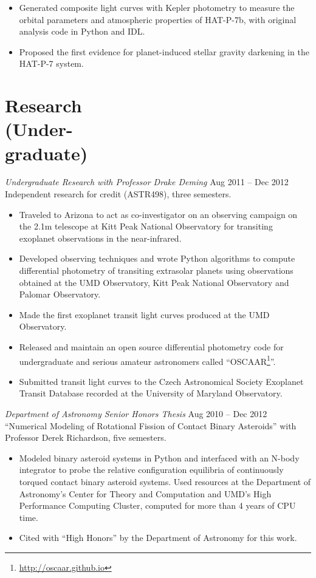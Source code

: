 \documentclass[margin]{res}
\begin{document}
\begin{resume}
\begin{itemize}
\item Generated composite light curves with Kepler photometry to measure the orbital parameters and atmospheric properties of HAT-P-7b, with original analysis code in Python and IDL. 

\item Proposed the first evidence for planet-induced stellar gravity darkening in the HAT-P-7 system.\\
\end{itemize}  

\section{Research \\(Under-\\graduate)} 
{\sl Undergraduate Research with Professor Drake Deming} \hfill            Aug 2011 -- Dec 2012 \\
Independent research for credit (ASTR498), three semesters. 
\begin{itemize}
\item Traveled to Arizona to act as co-investigator on an observing campaign on the 2.1m telescope at Kitt Peak National Observatory for transiting exoplanet observations in the near-infrared. 

\item Developed observing techniques and wrote Python algorithms to compute differential photometry of transiting extrasolar planets using observations obtained at the UMD Observatory, Kitt Peak National Observatory and Palomar Observatory. 

\item Made the first exoplanet transit light curves produced at the UMD Observatory.

\item Released and maintain an open source differential photometry code for undergraduate and serious amateur astronomers called ``OSCAAR\footnote{\url{http://oscaar.github.io}}''.

\item Submitted transit light curves to the Czech Astronomical Society Exoplanet Transit Database recorded at the University of Maryland Observatory.
\end{itemize} 

{\sl Department of Astronomy Senior Honors Thesis} \hfill Aug 2010 -- Dec 2012 \\
``Numerical Modeling of Rotational Fission of Contact Binary Asteroids'' with Professor Derek Richardson, five semesters. 
\begin{itemize}   
\item Modeled binary asteroid systems in Python and interfaced with an N-body integrator to probe the relative configuration equilibria of continuously torqued 
contact binary asteroid systems. Used resources at the Department of Astronomy's Center for Theory and Computation 
and UMD's High Performance Computing Cluster, computed for more than 4 years of CPU time. 
\item Cited with ``High Honors'' by the Department of Astronomy for this work.
\end{itemize}


\end{resume}
\end{document}
